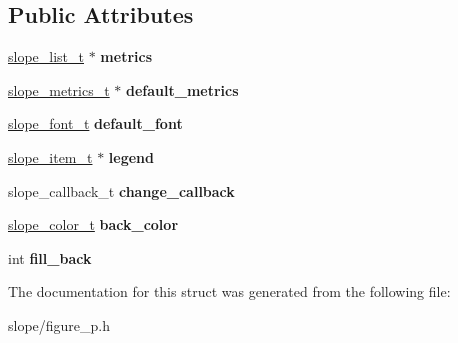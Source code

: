 \subsection*{Public Attributes}
\begin{DoxyCompactItemize}
\item 
\hypertarget{struct__slope__figure_a783cd1c9b86d7ddc6997a4b7e51b80df}{\hyperlink{group__List_ga88326d377deca937191acac6784bff0e}{slope\+\_\+list\+\_\+t} $\ast$ {\bfseries metrics}}\label{struct__slope__figure_a783cd1c9b86d7ddc6997a4b7e51b80df}

\item 
\hypertarget{struct__slope__figure_a76f248fab4d59b4170709525bca5883c}{\hyperlink{group__Metrics_gab80787ee8ae8dc449e770249fe0e3c35}{slope\+\_\+metrics\+\_\+t} $\ast$ {\bfseries default\+\_\+metrics}}\label{struct__slope__figure_a76f248fab4d59b4170709525bca5883c}

\item 
\hypertarget{struct__slope__figure_a1187fb125d8a66224dce9181887ed3c6}{\hyperlink{group__Primitives_ga29945f78eef5fcab497a3d15908b4b73}{slope\+\_\+font\+\_\+t} {\bfseries default\+\_\+font}}\label{struct__slope__figure_a1187fb125d8a66224dce9181887ed3c6}

\item 
\hypertarget{struct__slope__figure_ad5e0bd96cade55ef42f5a954322b0ac1}{\hyperlink{group__Item_ga2616141f0e164a876049da51ea3a8646}{slope\+\_\+item\+\_\+t} $\ast$ {\bfseries legend}}\label{struct__slope__figure_ad5e0bd96cade55ef42f5a954322b0ac1}

\item 
\hypertarget{struct__slope__figure_ab4d6de431e6f0b4a97b780b606ae0da3}{slope\+\_\+callback\+\_\+t {\bfseries change\+\_\+callback}}\label{struct__slope__figure_ab4d6de431e6f0b4a97b780b606ae0da3}

\item 
\hypertarget{struct__slope__figure_afce997af5c45b99ba7f123d40b5d0975}{\hyperlink{struct__slope__color}{slope\+\_\+color\+\_\+t} {\bfseries back\+\_\+color}}\label{struct__slope__figure_afce997af5c45b99ba7f123d40b5d0975}

\item 
\hypertarget{struct__slope__figure_ac29b1eb35fd245cf8603548bf360f415}{int {\bfseries fill\+\_\+back}}\label{struct__slope__figure_ac29b1eb35fd245cf8603548bf360f415}

\end{DoxyCompactItemize}


The documentation for this struct was generated from the following file\+:\begin{DoxyCompactItemize}
\item 
slope/figure\+\_\+p.\+h\end{DoxyCompactItemize}
